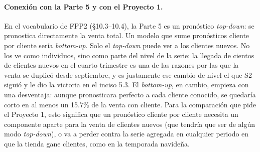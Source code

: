 \paragraph{Conexión con la Parte 5 y con el Proyecto 1.} En el vocabulario de
FPP2 (§10.3--10.4), la Parte 5 es un pronóstico \emph{top-down}: se
pronostica directamente la venta total. Un modelo que sume pronósticos cliente
por cliente sería \emph{bottom-up}. Solo el \emph{top-down} puede ver a los
clientes nuevos. No los ve como individuos, sino como parte del nivel de la
serie: la llegada de cientos de clientes nuevos en el cuarto trimestre es una
de las razones por las que la venta se duplicó desde septiembre, y es
justamente ese cambio de nivel el que S2 siguió y le dio la victoria en el
inciso 5.3. El \emph{bottom-up}, en cambio, empieza con una desventaja: aunque
pronosticara perfecto a cada cliente conocido, se quedaría corto en al menos
un 15.7\% de la venta con cliente. Para la comparación que pide el Proyecto 1,
esto significa que un pronóstico cliente por cliente necesita un componente
aparte para la venta de clientes nuevos (que tendría que ser de algún modo
\emph{top-down}), o va a perder contra la serie agregada en cualquier periodo
en que la tienda gane clientes, como en la temporada navideña.
